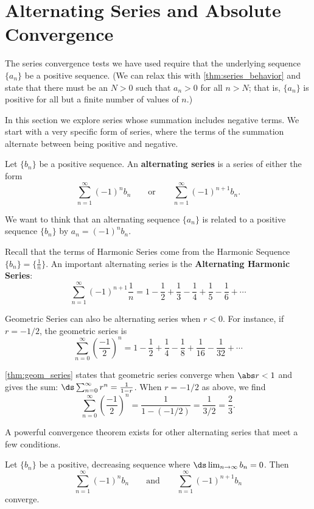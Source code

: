 \section{Alternating Series and Absolute Convergence}\label{sec:alt_series}

The series convergence tests we have used require that the underlying sequence $\{a_n\}$ be a positive sequence. (We can relax this with \autoref{thm:series_behavior} and state that there must be an $N>0$ such that $a_n>0$ for all $n>N$; that is, $\{a_n\}$ is positive for all but a finite number of values of $n$.)

In this section we explore series whose summation includes negative terms. We start with a very specific form of series, where the terms of the summation alternate between being positive and negative.

\begin{definition}\label{def:alt_series}
Let $\{b_n\}$ be a positive sequence. An \textbf{alternating series} is a series of either the form
\[
\sum_{n=1}^\infty (-1)^nb_n\qquad \text{or}\qquad \sum_{n=1}^\infty (-1)^{n+1}b_n.
\]
\end{definition}

We want to think that an alternating sequence $\{a_n\}$ is related to a positive sequence $\{b_n\}$ by $a_n=(-1)^n b_n$.

Recall that the terms of Harmonic Series come from the Harmonic Sequence $\{b_n\} = \{\frac1n\}$. An important alternating series is the \textbf{Alternating Harmonic Series}:
\[
\sum_{n=1}^\infty (-1)^{n+1}\frac1n
= 1-\frac12+\frac13-\frac14+\frac15-\frac16+\dotsb
\]

Geometric Series can also be alternating series when $r<0$. For instance, if $r=-1/2$, the geometric series is
\[
\sum_{n=0}^\infty \left(\frac{-1}{2}\right)^n
= 1-\frac12+\frac14-\frac18+\frac1{16}-\frac1{32}+\dotsb
\]

\autoref{thm:geom_series} states that geometric series converge when $\abs r<1$ and gives the sum: $\ds \sum_{n=0}^\infty r^n = \frac1{1-r}$. When $r=-1/2$ as above, we find
\[
\sum_{n=0}^\infty\left(\frac{-1}{2}\right)^n=\frac1{1-(-1/2)}=\frac 1{3/2}=\frac23.
\]

A powerful convergence theorem exists for other alternating series that meet a few conditions.

\begin{theorem}\label{thm:alt_series_test}
Let $\{b_n\}$ be a positive, decreasing sequence where $\ds\lim_{n\to\infty}b_n=0$. Then
\[
\sum_{n=1}^\infty (-1)^{n}b_n \qquad \text{and}\qquad \sum_{n=1}^\infty (-1)^{n+1}b_n
\]
converge.
\end{theorem}

